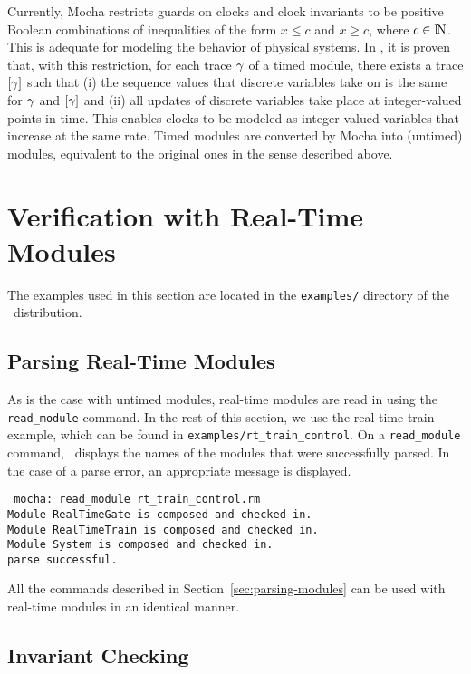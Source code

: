 Currently, {\sc Mocha} restricts guards on clocks and clock invariants
to be positive Boolean combinations of inequalities of the form $x \leq c$
and $x \geq c$, where $c \in {\rm I\!N}$. This is adequate for modeling the
behavior of physical systems. In
\cite{HMP92}, it is proven that, with this restriction, for
each trace $\gamma$ of a timed module, there exists a trace
$[\gamma]$ such that (i) the sequence values that discrete variables
take on is the same for $\gamma$ and $[\gamma]$ and (ii) all updates
of discrete variables take place at integer-valued points in
time. This enables clocks to be modeled as integer-valued variables
that increase at the same rate. Timed modules are converted by {\sc
Mocha} into (untimed) modules, equivalent to the original ones in the
sense described above.

\section{Verification with Real-Time Modules}

The examples used in this section are located in the {\tt examples/} directory of the \mocha\ distribution.

\subsection{Parsing Real-Time Modules}

As is the case with untimed modules, real-time modules are read in
using the {\tt read\_module} command. In the rest of this section, we
use the real-time train example, which can be found in {\tt examples/rt\_train\_control}.
On a {\tt read\_module} command,
\mocha\ displays the names of the modules that were successfully parsed. In
the case of a parse error, an appropriate message is displayed.

\mypar
{\tt
mocha: read\_module rt\_train\_control.rm \\
Module RealTimeGate is composed and checked in. \\
Module RealTimeTrain is composed and checked in. \\
Module System is composed and checked in.\\
parse successful.\\
}

All the commands described in Section~\ref{sec:parsing-modules}
can be used with real-time modules in an identical manner.


\subsection{Invariant Checking}

